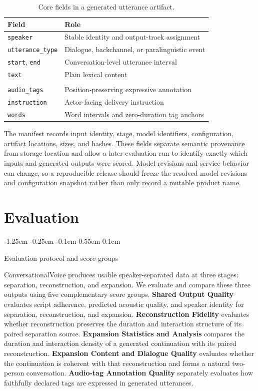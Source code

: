 \documentclass[10pt,twocolumn]{article}
\makeatletter
\renewcommand\subsection{%
  \@startsection{subsection}{2}{\z@}%
    {-1.25em \@plus -0.25em \@minus -0.1em}%
    {0.55em \@plus 0.1em}%
    {\normalfont\fontsize{10.5}{12.5}\selectfont\bfseries\raggedright
     \hyphenpenalty=10000\exhyphenpenalty=10000}}
\newcommand{\system}{\textsf{ConversationalVoice}\xspace}
\newcommand{\stage}[1]{\textsf{#1}}
\makeatother
\begin{document}
\begin{table}[t]
\centering
\caption{Core fields in a generated utterance artifact.}
\label{tab:schema}
\small
\begin{tabularx}{\columnwidth}{@{}p{}X@{}}
\toprule
Field & Role \\
\midrule
\texttt{speaker} & Stable identity and output-track assignment \\
\texttt{utterance\_type} & Dialogue, backchannel, or paralinguistic event \\
\texttt{start}, \texttt{end} & Conversation-level utterance interval \\
\texttt{text} & Plain lexical content \\
\shortstack[l]{\texttt{text\_with\_}\\\texttt{audio\_tags}} & Position-preserving expressive annotation \\
\texttt{instruction} & Actor-facing delivery instruction \\
\texttt{words} & Word intervals and zero-duration tag anchors \\
\bottomrule
\end{tabularx}
\end{table}

The manifest records input identity, stage, model identifiers, configuration, artifact locations, sizes, and hashes. These fields separate semantic provenance from storage location and allow a later evaluation run to identify exactly which inputs and generated outputs were scored. Model revisions and service behavior can change, so a reproducible release should freeze the resolved model revisions and configuration snapshot rather than only record a mutable product name.

\section{Evaluation}

\subsection{Evaluation protocol and score groups}

\system produces usable speaker-separated data at three stages: \stage{separation}, \stage{reconstruction}, and \stage{expansion}. We evaluate and compare these three outputs using five complementary score groups. \textbf{Shared Output Quality} evaluates script adherence, predicted acoustic quality, and speaker identity for \stage{separation}, \stage{reconstruction}, and \stage{expansion}. \textbf{Reconstruction Fidelity} evaluates whether reconstruction preserves the duration and interaction structure of its paired separation source. \textbf{Expansion Statistics and Analysis} compares the duration and interaction density of a generated continuation with its paired reconstruction. \textbf{Expansion Content and Dialogue Quality} evaluates whether the continuation is coherent with that reconstruction and forms a natural two-person conversation. \textbf{Audio-tag Annotation Quality} separately evaluates how faithfully declared tags are expressed in generated utterances.
\end{document}
